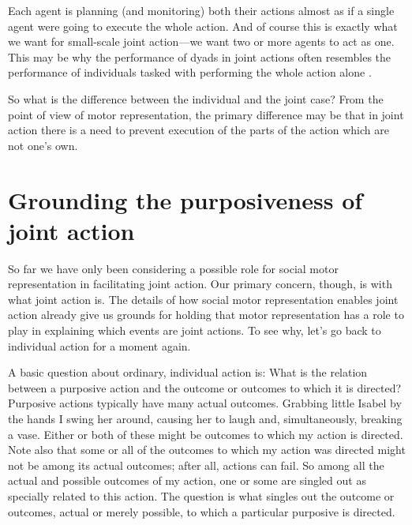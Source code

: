 \documentclass[12pt,\papersize]{extarticle}
\begin{document}
Each agent is planning (and monitoring) both their actions almost as if a single agent were going to execute the whole action.
And of course this is exactly what we want for small-scale joint action---we want two or more agents to act as one.
This may be why the performance of dyads in joint actions often resembles the performance of individuals tasked with performing the whole action alone \citep{Knoblich:2003nf}.

So what is the difference between the individual and the joint case?  From the point of view of motor representation, the primary difference may be that in joint action there is a need to prevent execution of the parts of the action which are not one’s own.



\section{Grounding the purposiveness of joint action}
So far we have only been considering a possible role for social motor representation in facilitating joint action.  
Our primary concern, though, is with what joint action is.
The details of how 
social motor representation enables joint action
 already give us grounds for holding that motor representation has a role to play in explaining which events are joint actions.
To see why,
let’s go back to individual action for a moment again.

A basic question about ordinary, individual action is:
What is the relation between a purposive action and the outcome or outcomes to which it is directed?
Purposive actions typically have many actual outcomes.
Grabbing little Isabel by the hands I swing her around, causing her to laugh and, simultaneously, breaking a vase.
Either or both of these might be outcomes to which my action is directed.
Note also that some or all of the outcomes to which my action was directed might not be among its actual outcomes; after all, actions can fail.
So among all the actual and possible outcomes of my action, one or some are singled out as specially related to this action.
The question is what singles out the outcome or outcomes, actual or merely possible, to which a particular purposive is directed.
\end{document}
